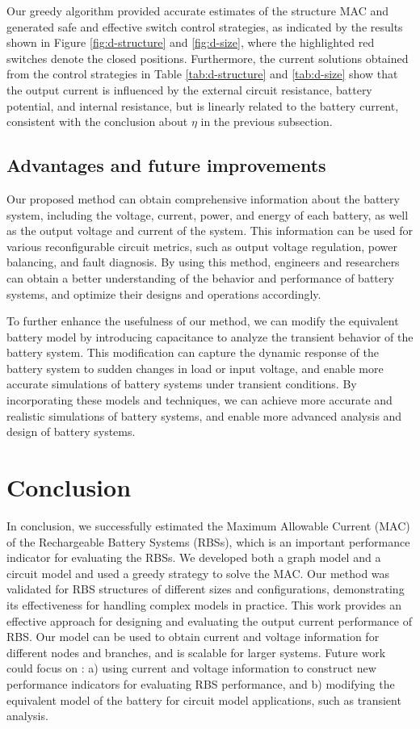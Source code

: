 \documentclass{article}
\begin{document}
Our greedy algorithm provided accurate estimates of the structure MAC and generated safe and effective switch control strategies, as indicated by the results shown in Figure \ref{fig:d-structure} and \ref{fig:d-size}, where the highlighted red switches denote the closed positions. 
Furthermore, the current solutions obtained from the control strategies in Table \ref{tab:d-structure} and \ref{tab:d-size} show that the output current is influenced by the external circuit resistance, battery potential, and internal resistance, but is linearly related to the battery current, consistent with the conclusion about $\eta$ in the previous subsection.

\subsection{Advantages and future improvements}

Our proposed method can obtain comprehensive information about the battery system, including the voltage, current, power, and energy of each battery, as well as the output voltage and current of the system.
This information can be used for various reconfigurable circuit metrics, such as output voltage regulation, power balancing, and fault diagnosis. 
By using this method, engineers and researchers can obtain a better understanding of the behavior and performance of battery systems, and optimize their designs and operations accordingly.

To further enhance the usefulness of our method, we can modify the equivalent battery model by introducing capacitance to analyze the transient behavior of the battery system. 
This modification can capture the dynamic response of the battery system to sudden changes in load or input voltage, and enable more accurate simulations of battery systems under transient conditions.
By incorporating these models and techniques, we can achieve more accurate and realistic simulations of battery systems, and enable more advanced analysis and design of battery systems.


\section{Conclusion}

In conclusion, we successfully estimated the Maximum Allowable Current (MAC) of the Rechargeable Battery Systems (RBSs), which is an important performance indicator for evaluating the RBSs. 
We developed both a graph model and a circuit model and used a greedy strategy to solve the MAC. 
Our method was validated for RBS structures of different sizes and configurations, demonstrating its effectiveness for handling complex models in practice. 
This work provides an effective approach for designing and evaluating the output current performance of RBS. 
Our model can be used to obtain current and voltage information for different nodes and branches, and is scalable for larger systems.
Future work could focus on : 
a) using current and voltage information to construct new performance indicators for evaluating RBS performance, and 
b) modifying the equivalent model of the battery for circuit model applications, such as transient analysis.




\end{document}
